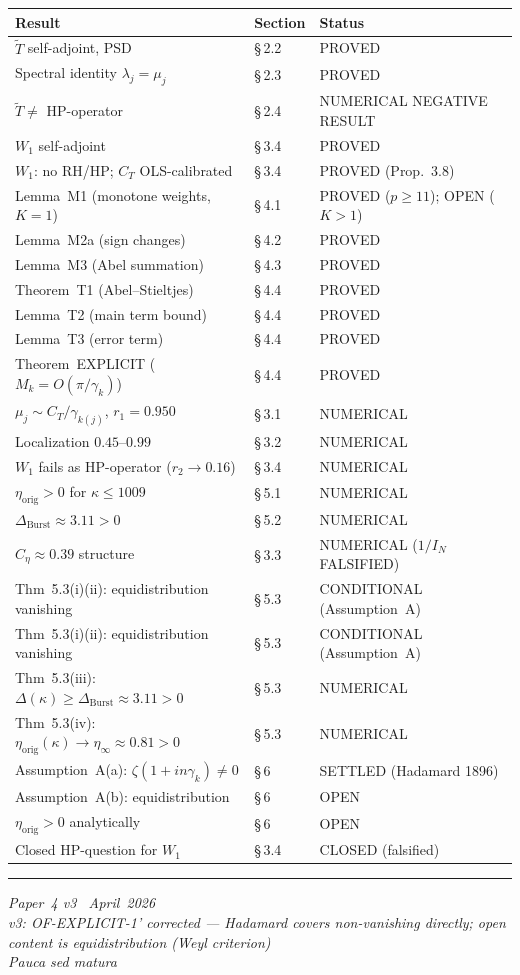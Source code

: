 \documentclass[11pt]{article}
\newcommand{\etaorig}{\eta_{\mathrm{orig}}}
\newcommand{\Tt}{\widetilde{T}}
\newcommand{\Ceta}{C_{\eta}}
\newcommand{\CT}{C_{T}}
\newcommand{\Wone}{W_1}
\newcommand{\Dburstvar}{\Delta_{\mathrm{Burst}}}
\begin{document}
\begin{center}
\renewcommand{\arraystretch}{1.2}
\begin{tabular}{lll}
\toprule
Result & Section & Status \\
\midrule
$\Tt$ self-adjoint, PSD & \S\,2.2 & PROVED \\
Spectral identity $\lambda_j=\mu_j$ & \S\,2.3 & PROVED \\
$\Tt\neq$ HP-operator & \S\,2.4 & NUMERICAL NEGATIVE RESULT \\
$\Wone$ self-adjoint & \S\,3.4 & PROVED \\
$\Wone$: no RH/HP; $\CT$ OLS-calibrated & \S\,3.4 & PROVED (Prop.~3.8) \\
Lemma~M1 (monotone weights, $K=1$) & \S\,4.1 & PROVED ($p\geq 11$); OPEN ($K>1$) \\
Lemma~M2a (sign changes) & \S\,4.2 & PROVED \\
Lemma~M3 (Abel summation) & \S\,4.3 & PROVED \\
Theorem~T1 (Abel--Stieltjes) & \S\,4.4 & PROVED \\
Lemma~T2 (main term bound) & \S\,4.4 & PROVED \\
Lemma~T3 (error term) & \S\,4.4 & PROVED \\
Theorem~EXPLICIT ($M_k=O(\pi/\gamma_k)$) & \S\,4.4 & PROVED \\
$\mu_j\sim\CT/\gamma_{k(j)}$, $r_1=0.950$ & \S\,3.1 & NUMERICAL \\
Localization $0.45$--$0.99$ & \S\,3.2 & NUMERICAL \\
$\Wone$ fails as HP-operator ($r_2\to 0.16$) & \S\,3.4 & NUMERICAL \\
$\etaorig > 0$ for $\kappa\leq 1009$ & \S\,5.1 & NUMERICAL \\
$\Dburstvar\approx 3.11 > 0$ & \S\,5.2 & NUMERICAL \\
$\Ceta\approx 0.39$ structure & \S\,3.3 & NUMERICAL ($1/I_N$ FALSIFIED) \\
Thm~5.3(i)(ii): equidistribution vanishing & \S\,5.3 & CONDITIONAL (Assumption~A) \\
Thm~5.3(i)(ii): equidistribution vanishing & \S\,5.3 & CONDITIONAL (Assumption~A) \\
Thm~5.3(iii): $\Delta(\kappa)\geq\Dburstvar\approx 3.11 > 0$
  & \S\,5.3 & NUMERICAL \\
Thm~5.3(iv): $\etaorig(\kappa)\to\eta_\infty\approx 0.81 > 0$
  & \S\,5.3 & NUMERICAL \\
Assumption~A(a): $\zeta(1+in\gamma_k)\neq 0$ & \S\,6 & SETTLED (Hadamard 1896) \\
Assumption~A(b): equidistribution & \S\,6 & OPEN \\
$\etaorig > 0$ analytically & \S\,6 & OPEN \\
Closed HP-question for $\Wone$ & \S\,3.4 & CLOSED (falsified) \\
\bottomrule
\end{tabular}
\end{center}

\bigskip
\hrule
\smallskip
\noindent\small
\emph{Paper~4 v3 \textperiodcentered\ April~2026}\\
\emph{v3: OF-EXPLICIT-1' corrected --- Hadamard covers non-vanishing directly;
open content is equidistribution (Weyl criterion)}\\
\emph{Pauca sed matura}
\end{document}
